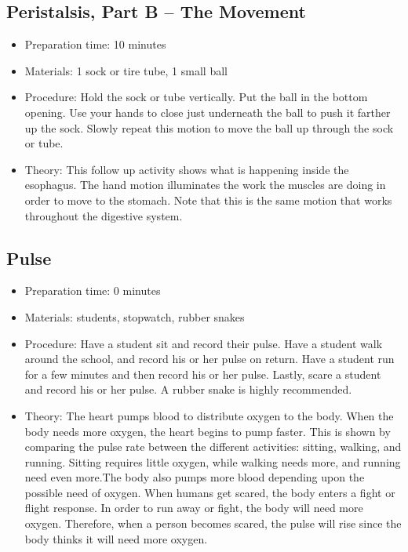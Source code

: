 \subsection{Peristalsis, Part B – The Movement}
\begin{itemize}
\item{Preparation time: 10 minutes}
\item{Materials: 1 sock or tire tube, 1 small ball}
\item{Procedure: Hold the sock or tube vertically. Put the ball in the bottom opening. Use your hands to close just underneath the ball to push it farther up the sock. Slowly repeat this motion to move the ball up through the sock or tube.}
\item{Theory: This follow up activity shows what is happening inside the esophagus. The hand motion illuminates the work the muscles are doing in order to move to the stomach. Note that this is the same motion that works throughout the digestive system.}
\end{itemize}

\subsection{Pulse}
\begin{itemize}
\item{Preparation time: 0 minutes}
\item{Materials: students, stopwatch, rubber snakes}
\item{Procedure: Have a student sit and record their pulse. Have a student walk around the school, and record his or her pulse on return. Have a student run for a few minutes and then record his or her pulse. Lastly, scare a student and record his or her pulse. A rubber snake is highly recommended.}
\item{Theory: The heart pumps blood to distribute oxygen to the body. When the body needs more oxygen, the heart begins to pump faster. This is shown by comparing the pulse rate between the different activities: sitting, walking, and running. Sitting requires little oxygen, while walking needs more, and running need even more.The body also pumps more blood depending upon the possible need of oxygen. When humans get scared, the body enters a fight or flight response. In order to run away or fight, the body will need more oxygen. Therefore, when a person becomes scared, the pulse will rise since the body thinks it will need more oxygen.}
\end{itemize}

